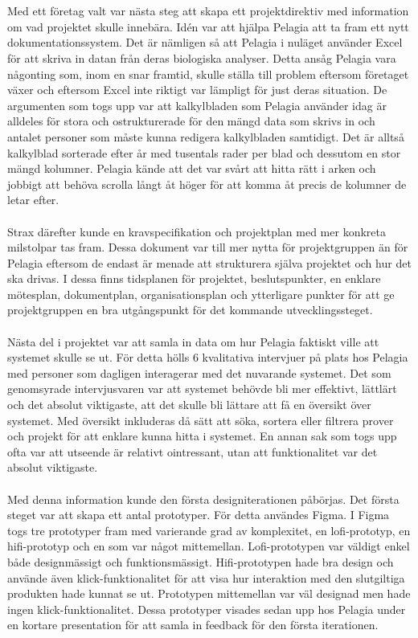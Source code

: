 \\
\\
Med ett företag valt var nästa steg att skapa ett projektdirektiv med information om vad projektet skulle innebära. Idén var att hjälpa Pelagia att ta fram ett nytt dokumentationssystem. Det är nämligen så att Pelagia i nuläget använder Excel för att skriva in datan från deras biologiska analyser. Detta ansåg Pelagia vara någonting som, inom en snar framtid, skulle ställa till problem eftersom företaget växer och eftersom Excel inte riktigt var lämpligt för just deras situation. De argumenten som togs upp var att kalkylbladen som Pelagia använder idag är alldeles för stora och ostrukturerade för den mängd data som skrivs in och antalet personer som måste kunna redigera kalkylbladen samtidigt. Det är alltså kalkylblad sorterade efter år med tusentals rader per blad och dessutom en stor mängd kolumner. Pelagia kände att det var svårt att hitta rätt i arken och jobbigt att behöva scrolla långt åt höger för att komma åt precis de kolumner de letar efter.
\\
\\
Strax därefter kunde en kravspecifikation och projektplan med mer konkreta milstolpar tas fram. Dessa dokument var till mer nytta för projektgruppen än för Pelagia eftersom de endast är menade att strukturera själva projektet och hur det ska drivas. I dessa finns tidsplanen för projektet, beslutspunkter, en enklare mötesplan, dokumentplan, organisationsplan och ytterligare punkter för att ge projektgruppen en bra utgångspunkt för det kommande utvecklingssteget.
\\
\\
Nästa del i projektet var att samla in data om hur Pelagia faktiskt ville att systemet skulle se ut. För detta hölls 6 kvalitativa intervjuer på plats hos Pelagia med personer som dagligen interagerar med det nuvarande systemet. Det som genomsyrade intervjusvaren var att systemet behövde bli mer effektivt, lättlärt och det absolut viktigaste, att det skulle bli lättare att få en översikt över systemet. Med översikt inkluderas då sätt att söka, sortera eller filtrera prover och projekt för att enklare kunna hitta i systemet. En annan sak som togs upp ofta var att utseende är relativt ointressant, utan att funktionalitet var det absolut viktigaste.
\\
\\
Med denna information kunde den första designiterationen påbörjas. Det första steget var att skapa ett antal prototyper. För detta användes Figma. I Figma togs tre prototyper fram med varierande grad av komplexitet, en lofi-prototyp, en hifi-prototyp och en som var något mittemellan. Lofi-prototypen var väldigt enkel både designmässigt och funktionsmässigt. Hifi-prototypen hade bra design och använde även klick-funktionalitet för att visa hur interaktion med den slutgiltiga produkten hade kunnat se ut. Prototypen mittemellan var väl designad men hade ingen klick-funktionalitet. Dessa prototyper visades sedan upp hos Pelagia under en kortare presentation för att samla in feedback för den första iterationen.
